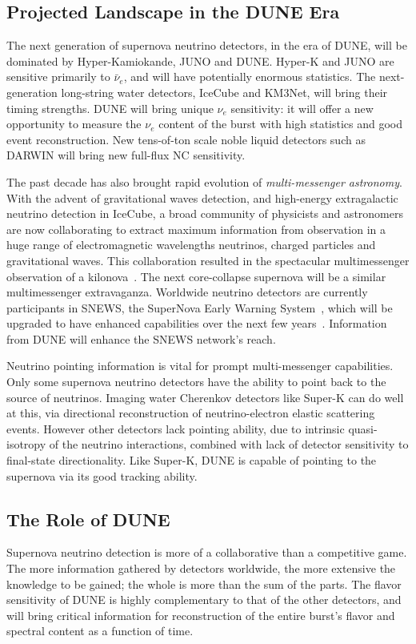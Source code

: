 \subsection{Projected Landscape in the DUNE Era}
The next generation of supernova neutrino detectors, in the era of
DUNE, will be dominated by Hyper-Kamiokande, JUNO and DUNE.  Hyper-K
and JUNO are sensitive primarily to $\bar{\nu}_e$, and will have
potentially enormous statistics.  The next-generation long-string
water detectors, IceCube and KM3Net, will bring their timing
strengths.  DUNE will bring unique $\nu_e$ sensitivity: it will offer
a new opportunity to measure the $\nu_e$ content of the burst with
high statistics and good event reconstruction.  New tens-of-ton scale
noble liquid detectors such as DARWIN will bring new full-flux NC
sensitivity.

The past decade has also brought rapid evolution of
\textit{multi-messenger astronomy}.  With the advent of gravitational
waves detection, and high-energy extragalactic neutrino detection in
IceCube, a broad community of physicists and astronomers are now
collaborating to extract maximum information from observation in a
huge range of electromagnetic wavelengths neutrinos, charged particles
and gravitational waves.  This collaboration resulted in the
spectacular multimessenger observation of a kilonova~\cite{blah}.  The
next core-collapse supernova will be a similar multimessenger
extravaganza.  Worldwide neutrino detectors are currently participants
in SNEWS, the SuperNova Early Warning System~\cite{}, which will be
upgraded to have enhanced capabilities over the next few
years~\cite{snews2.0}.  Information from DUNE will enhance the SNEWS
network's reach.

Neutrino pointing information is vital for prompt multi-messenger
capabilities.  Only some supernova neutrino detectors have the ability
to point back to the source of neutrinos.  Imaging water Cherenkov
detectors like Super-K can do well at this, via directional
reconstruction of neutrino-electron elastic scattering events. However other detectors
lack pointing ability, due to intrinsic quasi-isotropy of the neutrino
interactions, combined with lack of detector sensitivity to
final-state directionality.  Like Super-K, DUNE is capable of pointing
to the supernova via its good tracking ability.

\subsection{The Role of DUNE}
Supernova neutrino detection is more of a collaborative than a
competitive game.  The more information gathered by detectors
worldwide, the more extensive the knowledge to be gained; the whole is
more than the sum of the parts.  The flavor sensitivity of DUNE is
highly complementary to that of the other detectors, and will bring
critical information for reconstruction of the entire burst's flavor and
spectral content as a function of time.


